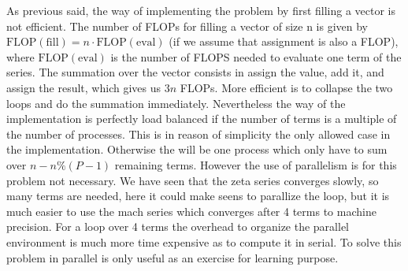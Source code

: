 As previous said, the way of implementing the problem by first filling a vector is not efficient. The number of FLOPs for filling a vector of size n is given by $\text{FLOP}(\text{fill}) = n \cdot \text{FLOP}(\text{eval})$ (if we assume that assignment is also a FLOP), where $\text{FLOP}(\text{eval})$ is the number of FLOPS needed to evaluate one term of the series. The summation over the vector consists in assign the value, add it, and assign the result, which gives us $3n$ FLOPs. More efficient is to collapse the two loops and do the summation immediately. Nevertheless the way of the implementation is perfectly load balanced if the number of terms is a multiple of the number of processes. This is in reason of simplicity the only allowed case in the implementation. Otherwise the will be one process which only have to sum over $n - n \% (P-1)$ remaining terms. However the use of parallelism is for this problem not necessary. We have seen that the zeta series converges slowly, so many terms are needed, here it could make seens to parallize the loop, but it is much easier to use the mach series which converges after 4 terms to machine precision. For a loop over 4 terms the overhead to organize the parallel environment is much more time expensive as to compute it in serial. To solve this problem in parallel is only useful as an exercise for learning purpose. 





